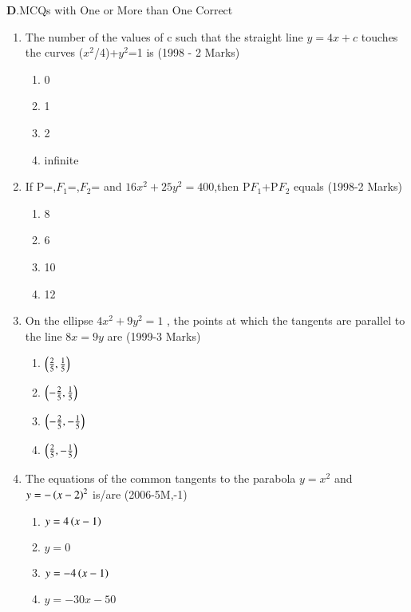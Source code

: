 \documentclass[journal,12pt,onecolumn]{IEEEtran}
\theoremstyle{remark}
\begin{document}
		\textbf{D}.MCQs with One or More than One Correct
		\vspace{0.5cm}
\begin{enumerate}
\item The number of the values of c such that the straight line $y=4x+c$ touches the curves ($x^2$/4)+$y^2$=1 is \hfill(1998 - 2 Marks)\\
	\begin{enumerate}
	\item 0
	\item 1
	\item 2
	\item infinite
	\end{enumerate}

\item If P=,$F_{1}$=,$F_{2}$= and $16x^2+25y^2=400$,then P$F_{1}$+P$F_{2}$ equals \hfill(1998-2 Marks)\\
	\begin{enumerate}
		\item 8
		\item 6
		\item 10
		\item 12
	\end{enumerate}

\item On the ellipse $4x^2+9y^2=1$ , the points at which the tangents are parallel to the line $8x=9y$ are \hfill(1999-3 Marks)\\
	\begin{enumerate}
		\item $\left(\frac{2}{5},\frac{1}{5}\right)$
		\item $\left(-\frac{2}{5},\frac{1}{5}\right)$
		\item $\left(-\frac{2}{5},-\frac{1}{5}\right)$
		\item $\left(\frac{2}{5},-\frac{1}{5}\right)$
	\end{enumerate}

\item The equations of the common tangents to the parabola $y=x^2$ and $y=-\left(x-2\right)^2$ is/are \hfill(2006-5M,-1)\\
	\begin{enumerate}
		\item $y=4\left(x-1\right)$
		\item $y=0$
		\item $y=-4\left(x-1\right)$
		\item $y=-30x-50$
	\end{enumerate}


\end{enumerate}
\end{document}
